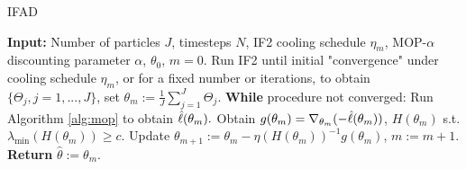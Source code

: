 \documentclass[11pt]{article}
\begin{document}



\begin{algorithm}[H]
	\caption{IFAD}
    \label{alg:ifad}
	    \textbf{Input:} Number of particles $J$, timesteps $N$, IF2 cooling schedule $\eta_m$, MOP-$\alpha$ discounting parameter $\alpha$, $\theta_0$, $m=0.$\newline
        Run IF2 until initial "convergence" under cooling schedule $\eta_m$, or for a fixed number or iterations, to obtain $\{\Theta_j, j=1,...,J\}$, set $\theta_m := \frac{1}{J}\sum_{j=1}^J \Theta_j.$\newline
		\textbf{While} procedure not converged: \newline
		\hspace*{4mm} Run Algorithm \ref{alg:mop} to obtain $\hat{\ell}(\theta_m).$ \newline
		\hspace*{4mm} Obtain $g(\theta_m) = \nabla_{\theta_m} (-\hat{\ell}(\theta_m))$, $H(\theta_m)$ s.t. $\lambda_{\min}(H(\theta_m)) \geq c$. \newline
		\hspace*{4mm} Update $\theta_{m+1} := \theta_m - \eta (H(\theta_m))^{-1} g(\theta_m)$, $m:=m+1.$ \newline
		\textbf{Return} $\hat{\theta} := \theta_m.$
\end{algorithm}
\end{document}
